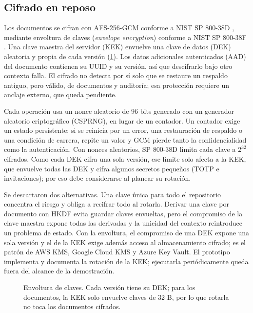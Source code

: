 \subsection{Cifrado en reposo}\label{sec:cifrado-reposo}

Los documentos se cifran con AES-256-GCM conforme a NIST SP 800-38D \cite{dworkin2007}, mediante envoltura de claves (\emph{envelope encryption}) conforme a NIST SP 800-38F \cite{dworkin2012}. Una clave maestra del servidor (KEK) envuelve una clave de datos (DEK) aleatoria y propia de cada versión (\cref{fig:cripto-sobre}). Los datos adicionales autenticados (AAD) del documento contienen su UUID y su versión, así que descifrarlo bajo otro contexto falla. El cifrado no detecta por sí solo que se restaure un respaldo antiguo, pero válido, de documentos y auditoría; esa protección requiere un anclaje externo, que queda pendiente.

Cada operación usa un nonce aleatorio de 96 bits generado con un generador aleatorio criptográfico (CSPRNG), en lugar de un contador. Un contador exige un estado persistente; si se reinicia por un error, una restauración de respaldo o una condición de carrera, repite un valor y GCM pierde tanto la confidencialidad como la autenticación. Con nonces aleatorios, SP 800-38D limita cada clave a $2^{32}$ cifrados. Como cada DEK cifra una sola versión, ese límite solo afecta a la KEK, que envuelve todas las DEK y cifra algunos secretos pequeños (TOTP e invitaciones); por eso debe considerarse al planear su rotación.

Se descartaron dos alternativas. Una clave única para todo el repositorio concentra el riesgo y obliga a recifrar todo al rotarla. Derivar una clave por documento con HKDF evita guardar claves envueltas, pero el compromiso de la clave maestra expone todas las derivadas y la unicidad del contexto reintroduce un problema de estado. Con la envoltura, el compromiso de una DEK expone una sola versión y el de la KEK exige además acceso al almacenamiento cifrado; es el patrón de AWS KMS, Google Cloud KMS y Azure Key Vault. El prototipo implementa y documenta la rotación de la KEK; ejecutarla periódicamente queda fuera del alcance de la demostración.

\begin{figure}[!htbp]
  \centering
  
  \caption{Envoltura de claves. Cada versión tiene su DEK; para los documentos, la KEK solo envuelve claves de 32 B, por lo que rotarla no toca los documentos cifrados.}
  \label{fig:cripto-sobre}
\end{figure}

